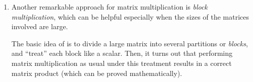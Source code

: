 \begin{enumerate}
Examples:
\begin{itemize}
\item \begin{align*}
\mqty[1&2&3\\ 3&2&1]\mqty[1&0\\ 0&1\\ 1&2]
&=\mqty[
\mqty[\blc{1}&\vc{2}&\orc{3}]
\mqty[\blc{1}&\blc{0}\\ \vc{0}&\vc{1}\\ \orc{1}&\orc{2}]\\
\mqty[\blc{3}&\vc{2}&\orc{1}]
\mqty[\blc{1}&\blc{0}\\ \vc{0}&\vc{1}\\ \orc{1}&\orc{2}]
]\\
&=\mqty[
\blc{1}\mqty[\blc{1}&\blc{0}]
+\vc{2}\mqty[\vc{0}&\vc{1}]
+\orc{3}\mqty[\orc{1}&\orc{2}]
\\
\blc{3}\mqty[\blc{1}&\blc{0}]
+\vc{2}\mqty[\vc{0}&\vc{1}]
+\orc{1}\mqty[\orc{1}&\orc{2}]
]\\
&=\mqty[4&8\\ 4&4]
\end{align*}

\item \begin{align*}
\mqty[1&2&3\\ \rc{3}&\rc{2}&\rc{1}]\mqty[\rc{1}&0\\ \rc{0}&1\\ \rc{1}&2]
&=\mqty[
\mqty[1&2&3]
\mqty[1&0\\ 0&1\\ 1&2]\\
\mqty[\rc{3}&\rc{2}&\rc{1}]
\mqty[\rc{1}&0\\ \rc{0}&1\\ \rc{1}&2]
]\\
&=\mqty[
1\mqty[1&0]
+2\mqty[0&1]
+3\mqty[1&2]
\\
\rc{3}\mqty[\rc{1}&0]
+\rc{2}\mqty[\rc{0}&1]
+\rc{1}\mqty[\rc{1}&2]
]\\
&=\mqty[4&8\\ \rc{4}&4]
\end{align*}
\end{itemize}
\item Another remarkable approach for matrix multiplication is \emph{block
multiplication}, which can be helpful especially when the sizes of the matrices
involved are large.

The basic idea of  is to divide a large matrix into
several partitions or \emph{blocks}, and ``treat'' each block like a scalar.
Then, it turns out that performing matrix multiplication as usual under this
treatment results in a correct matrix product (which can be proved
mathematically).


\end{enumerate}
